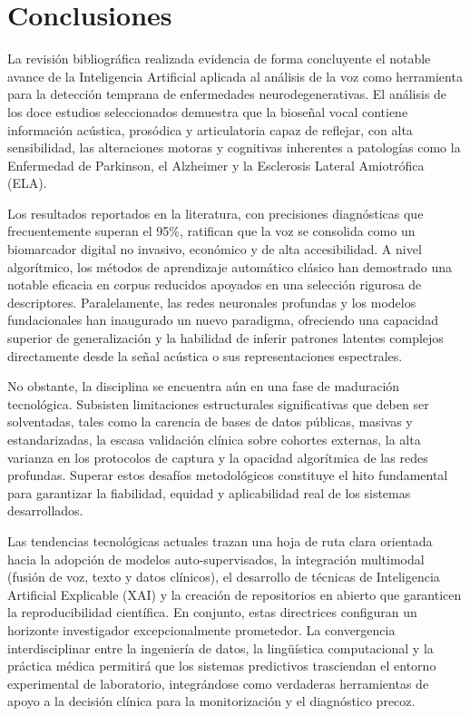 \section{Conclusiones}\label{sec:conclusiones_soa}

La revisión bibliográfica realizada evidencia de forma concluyente el notable avance de la Inteligencia Artificial aplicada al análisis de la voz como herramienta para la detección temprana de enfermedades neurodegenerativas. El análisis de los doce estudios seleccionados demuestra que la bioseñal vocal contiene información acústica, prosódica y articulatoria capaz de reflejar, con alta sensibilidad, las alteraciones motoras y cognitivas inherentes a patologías como la Enfermedad de Parkinson, el Alzheimer y la Esclerosis Lateral Amiotrófica (ELA).

Los resultados reportados en la literatura, con precisiones diagnósticas que frecuentemente superan el 95\%, ratifican que la voz se consolida como un biomarcador digital no invasivo, económico y de alta accesibilidad. A nivel algorítmico, los métodos de aprendizaje automático clásico han demostrado una notable eficacia en corpus reducidos apoyados en una selección rigurosa de descriptores. Paralelamente, las redes neuronales profundas y los modelos fundacionales han inaugurado un nuevo paradigma, ofreciendo una capacidad superior de generalización y la habilidad de inferir patrones latentes complejos directamente desde la señal acústica o sus representaciones espectrales.

No obstante, la disciplina se encuentra aún en una fase de maduración tecnológica. Subsisten limitaciones estructurales significativas que deben ser solventadas, tales como la carencia de bases de datos públicas, masivas y estandarizadas, la escasa validación clínica sobre cohortes externas, la alta varianza en los protocolos de captura y la opacidad algorítmica de las redes profundas. Superar estos desafíos metodológicos constituye el hito fundamental para garantizar la fiabilidad, equidad y aplicabilidad real de los sistemas desarrollados.

Las tendencias tecnológicas actuales trazan una hoja de ruta clara orientada hacia la adopción de modelos auto-supervisados, la integración multimodal (fusión de voz, texto y datos clínicos), el desarrollo de técnicas de Inteligencia Artificial Explicable (XAI) y la creación de repositorios en abierto que garanticen la reproducibilidad científica. En conjunto, estas directrices configuran un horizonte investigador excepcionalmente prometedor. La convergencia interdisciplinar entre la ingeniería de datos, la lingüística computacional y la práctica médica permitirá que los sistemas predictivos trasciendan el entorno experimental de laboratorio, integrándose como verdaderas herramientas de apoyo a la decisión clínica para la monitorización y el diagnóstico precoz.